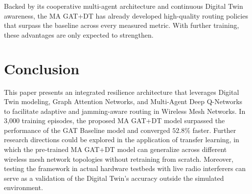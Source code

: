 \documentclass[conference]{IEEEtran}
\begin{document}
Backed by its cooperative multi-agent architecture and continuous Digital Twin awareness, the MA GAT+DT has already developed high-quality routing policies that surpass the baseline across every measured metric. With further training, these advantages are only expected to strengthen.

\section{Conclusion}
This paper presents an integrated resilience architecture that leverages Digital Twin modeling, Graph Attention Networks, and Multi-Agent Deep Q-Networks to facilitate adaptive and jamming-aware routing in Wireless Mesh Networks. In 3,000 training episodes, the proposed MA GAT+DT model surpassed the performance of the GAT Baseline model and converged $52.8\%$ faster. Further research directions could be explored in the application of transfer learning, in which the pre-trained MA GAT+DT model can generalize across different wireless mesh network topologies without retraining from scratch. Moreover, testing the framework in actual hardware testbeds with live radio interferers can serve as a validation of the Digital Twin's accuracy outside the simulated environment.
\end{document}

